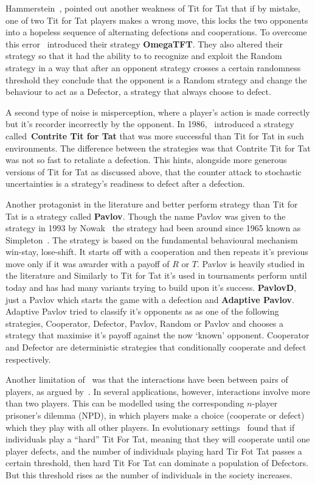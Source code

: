 \documentclass{article}
\theoremstyle{definition}
\begin{document}
Hammerstein~\cite{Hammerstein1984}, pointed out another weakness of Tit
for Tat that if by mistake, one of two Tit for Tat players makes a wrong move,
this locks the two opponents into a hopeless sequence of alternating defections
and cooperations. To overcome this error~\cite{Wolfgang2006} introduced their
strategy \textbf{OmegaTFT}. They also altered their strategy so that it had the ability to
to recognize and exploit the Random strategy in a way that after an opponent
strategy crosses a certain randomness threshold they conclude that the opponent is
a Random strategy and change the behaviour to act as a Defector, a strategy that
always choose to defect.

A second type of noise is misperception, where a player's action is made correctly
but it's recorder incorrectly by the opponent. In 1986,~\cite{Sugden2004} introduced
a strategy called~\textbf{Contrite Tit for Tat} that was more successful than Tit
for Tat in such environments. The difference between the strategies was that
Contrite Tit for Tat was not so fast to retaliate a defection. This hints, alongside
more generous versions of Tit for Tat as discussed above, that the counter attack
to stochastic uncertainties is a strategy's readiness to defect after a defection.

Another protagonist in the literature and better perform strategy than Tit for Tat
is a strategy called \textbf{Pavlov}. Though the name Pavlov was given to the
strategy in 1993 by Nowak~\cite{Nowak1993} the strategy had been around since 1965
known as Simpleton~\cite{rapoport1965}. The strategy is based on the fundamental
behavioural mechanism win-stay, lose-shift. It starts off with a cooperation and
then repeats it's previous move only if it was awarder with a payoff of \(R\) or
\(T\). Pavlov is heavily studied in the literature and Similarly to Tit for Tat
it's used in tournaments perform until today and has had many variants trying
to build upon it's success. \textbf{PavlovD}, just a Pavlov which starts the game
with a defection and \textbf{Adaptive Pavlov}. Adaptive Pavlov tried to
classify it's opponents as as one of the following strategies, Cooperator, Defector,
Pavlov, Random or Pavlov and chooses a strategy that maximise it's payoff against
the now `known' opponent.
Cooperator and Defector are deterministic strategies that conditionally cooperate
and defect respectively.

Another limitation of~\cite{axelrod1981} was that the
interactions have been between pairs of players, as argued by~\cite{Joshi1987}.
In several applications, however, interactions involve more
than two players. This can be modelled using the corresponding \(n\)-player prisoner's
dilemma (NPD), in which players make a choice (cooperate or defect) which they play
with all other players. In evolutionary settings~\cite{Joshi1987} found that if
individuals play a ``hard'' Tit For Tat, meaning that they will cooperate until one
player defects, and the number of individuals playing hard Tir Fot Tat passes a
certain threshold, then hard Tit For Tat can dominate a population of Defectors.
But this threshold rises as the number of individuals in the society increases.
\end{document}
